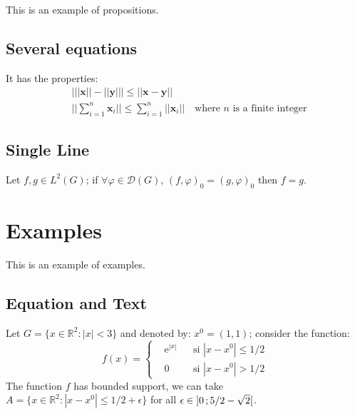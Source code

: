 \documentclass[11pt,fleqn]{book} %
\begin{document}
{This is an example of propositions.

\subsection{Several equations}

\begin{proposition}
It has the properties:
\begin{align}
& \big| ||\mathbf{x}|| - ||\mathbf{y}|| \big|\leq || \mathbf{x}- \mathbf{y}||\\
&  ||\sum_{i=1}^n\mathbf{x}_i||\leq \sum_{i=1}^n||\mathbf{x}_i||\quad\text{where $n$ is a finite integer}
\end{align}
\end{proposition}

\subsection{Single Line}

\begin{proposition} 
Let $f,g\in L^2(G)$; if $\forall \varphi\in\mathcal{D}(G)$, $(f,\varphi)_0=(g,\varphi)_0$ then $f = g$. 
\end{proposition}


\section{Examples}

This is an example of examples.

\subsection{Equation and Text}

\begin{example}
Let $G=\{x\in\mathbb{R}^2:|x|<3\}$ and denoted by: $x^0=(1,1)$; consider the function:
\begin{equation}
f(x)=\left\{\begin{aligned} & \mathrm{e}^{|x|} & & \text{si $|x-x^0|\leq 1/2$}\\
& 0 & & \text{si $|x-x^0|> 1/2$}\end{aligned}\right.
\end{equation}
The function $f$ has bounded support, we can take $A=\{x\in\mathbb{R}^2:|x-x^0|\leq 1/2+\epsilon\}$ for all $\epsilon\in\mathopen{]}0\,;5/2-\sqrt{2}\mathclose{[}$.
\end{example}

}
\end{document}

